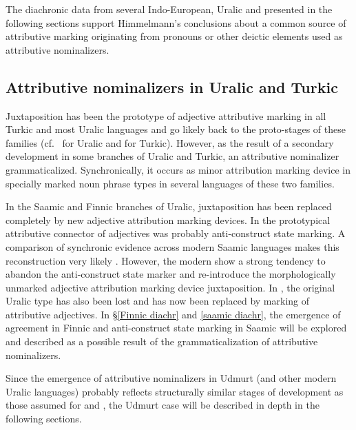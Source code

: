 The diachronic data from several Indo-European, Uralic and  presented in the following sections support Himmelmann's conclusions about a common source of attributive marking originating from pronouns or other deictic elements used as attributive nominalizers.

\subsection{Attributive nominalizers in Uralic and Turkic}
\label{uralic-turkic diachr}
Juxtaposition has been the prototype of adjective attributive marking in all Turkic and most Uralic languages and go likely back to the proto-stages of these families (cf.~\citealt[80–81]{decsy1990} for Uralic and \citealt[75–76]{decsy1998} for Turkic). However, as the result of a secondary development in some branches of Uralic and Turkic, an attributive nominalizer grammaticalized. Synchronically, it occurs as minor attribution marking device in specially marked noun phrase types in several languages of these two families.%

In the Saamic and Finnic branches of Uralic, juxtaposition has been replaced completely by new adjective attribution marking devices. In  the prototypical attributive connector of adjectives was probably anti\hyp{}construct state marking. A comparison of synchronic evidence across modern Saamic languages makes this reconstruction very likely \citep{riesler2006b}. However, the modern  show a strong tendency to abandon the anti\hyp{}construct state marker and re-introduce the morphologically unmarked adjective attribution marking device juxtaposition. In , the original Uralic type has also been lost and has now been replaced by  marking of attributive adjectives. In \S\ref{Finnic diachr} and \ref{saamic diachr}, the emergence of agreement in Finnic and anti\hyp{}construct state marking in Saamic will be explored and described as a possible result of the grammaticalization of attributive nominalizers.

Since the emergence of attributive nominalizers in Udmurt (and other modern Uralic languages) probably reflects structurally similar stages of development as those assumed for  and , the Udmurt case will be described in depth in the following sections.

